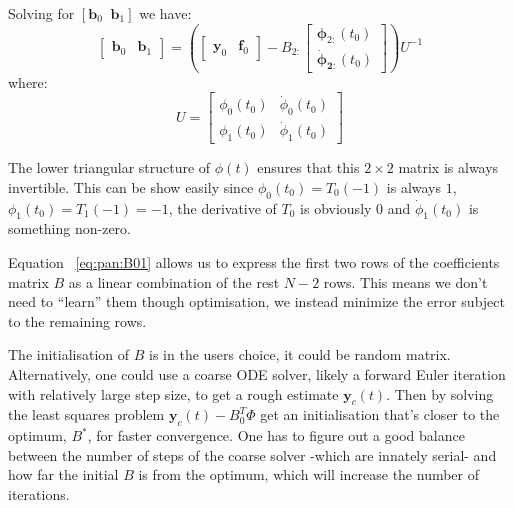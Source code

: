 \documentclass[11pt]{report}
\begin{document}
    Solving for $[\pmb{b}_0 \;\; \pmb{b}_1]$ we have:
    \begin{equation}
        \label{eq:pan:B01}
        \begin{bmatrix}
            \pmb{b}_0 & \pmb{b}_1
        \end{bmatrix}
        =
        \left(
        \begin{bmatrix}
            \pmb{y}_0 & \pmb{f}_0
        \end{bmatrix}
        -
        B_{2:}
        \begin{bmatrix}
            \pmb\phi_{2:}(t_0) \\ \pmb{\dot{\phi}_{2:}}(t_0)
        \end{bmatrix}
        \right)
        U^{-1}
    \end{equation}
    where:
    \begin{equation*}
        U =
        \begin{bmatrix}
            \phi_0(t_0) & \dot{\phi}_0(t_0) \\
            \phi_1(t_0) & \dot{\phi}_1(t_0)
        \end{bmatrix}
    \end{equation*}

    The lower triangular structure of $\phi(t)$ ensures that this $2\times 2 $ matrix is always invertible.
    This can be show easily since $\phi_0(t_0) = T_0(-1)$ is always $1$,  $\phi_1(t_0) = T_1(-1) = -1$, the derivative of
    $T_0$ is obviously $0$ and $\dot\phi_1(t_0)$ is something non-zero.

    Equation ~\eqref{eq:pan:B01} allows us to express the first two rows of the coefficients matrix $B$ as a linear combination
    of the rest $N-2$ rows.
    This means we don't need to ``learn'' them though optimisation, we instead minimize the error subject to the
    remaining rows.

    The initialisation of $B$ is in the users choice, it could be random matrix.
    Alternatively, one could use a coarse ODE solver, likely a forward Euler iteration with relatively large step size,
    to get a rough estimate $\pmb{y}_c(t)$.
    Then by solving the least squares problem $\pmb{y}_c(t) - B^T_0 \Phi $ get an initialisation that's closer to the
    optimum, $B^*$, for faster convergence.
    One has to figure out a good balance between the number of steps of the coarse solver -which are innately serial-
    and how far the initial $B$ is from the optimum, which will increase the number of iterations.
\end{document}
